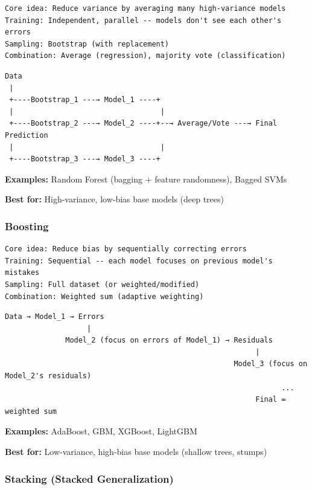 \documentclass[11pt]{article}
\begin{document}
\begin{verbatim}
Core idea: Reduce variance by averaging many high-variance models
Training: Independent, parallel -- models don't see each other's errors
Sampling: Bootstrap (with replacement)
Combination: Average (regression), majority vote (classification)
\end{verbatim}

\setcodelang{}

\begin{verbatim}
Data
 |
 +----Bootstrap_1 ---→ Model_1 ----+
 |                                  |
 +----Bootstrap_2 ---→ Model_2 ----+--→ Average/Vote ---→ Final Prediction
 |                                  |
 +----Bootstrap_3 ---→ Model_3 ----+
\end{verbatim}

\textbf{Examples:} Random Forest (bagging + feature randomness), Bagged SVMs

\textbf{Best for:} High-variance, low-bias base models (deep trees)

\subsubsection{Boosting}\label{boosting}

\setcodelang{}

\begin{verbatim}
Core idea: Reduce bias by sequentially correcting errors
Training: Sequential -- each model focuses on previous model's mistakes
Sampling: Full dataset (or weighted/modified)
Combination: Weighted sum (adaptive weighting)
\end{verbatim}

\setcodelang{}

\begin{verbatim}
Data → Model_1 → Errors
                   |
              Model_2 (focus on errors of Model_1) → Residuals
                                                          |
                                                     Model_3 (focus on Model_2's residuals)
                                                                ...
                                                          Final = weighted sum
\end{verbatim}

\textbf{Examples:} AdaBoost, GBM, XGBoost, LightGBM

\textbf{Best for:} Low-variance, high-bias base models (shallow trees, stumps)

\subsubsection{Stacking (Stacked Generalization)}\label{stacking-stacked-generalization}
\end{document}
